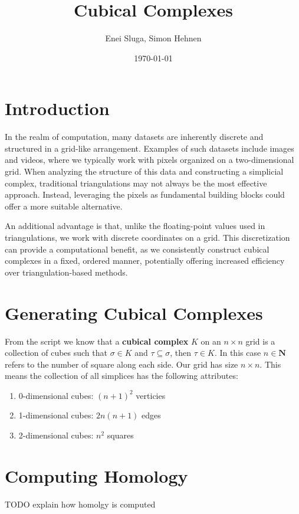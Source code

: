 \documentclass{article}
\title{Cubical Complexes} %
\author{Enei Sluga, Simon Hehnen} %
\affil
{
    Faculty of Computer and Information Science \\
    University of Ljubljana %
}
\date{\today} %
\begin{document}
    \maketitle

    \section{Introduction}
    In the realm of computation, many datasets are inherently discrete and structured in a
    grid-like arrangement. Examples of such datasets include images and videos,
    where we typically work with pixels organized on a two-dimensional grid.
    When analyzing the structure of this data and constructing a simplicial complex,
    traditional triangulations may not always be the most effective approach.
    Instead, leveraging the pixels as fundamental building blocks could offer a
    more suitable alternative.
    
    An additional advantage is that, unlike the floating-point values used in triangulations,
    we work with discrete coordinates on a grid. This discretization can provide a
    computational benefit, as we consistently construct cubical complexes in a fixed,
    ordered manner, potentially offering increased efficiency over triangulation-based methods.
    
    \section{Generating Cubical Complexes}
    From the script we know that a \textbf{cubical complex} $K$ on an $n \times n$ grid
    is a collection of cubes such that $\sigma \in K$ and $\tau \subseteq \sigma$, then $\tau \in K$.
    In this case $n \in \mathbf{N}$ refers to the number of square along each side.
    Our grid has size $n \times n$. This means the collection of all simplices has the following attributes:
    \begin{enumerate}
        \item 0-dimensional cubes: $(n+1)^2$ verticies
        \item 1-dimensional cubes: $2n(n+1)$ edges
        \item 2-dimensional cubes: $n^2$ squares
    \end{enumerate}



    \section{Computing Homology}
    TODO explain how homolgy is computed
\end{document}
